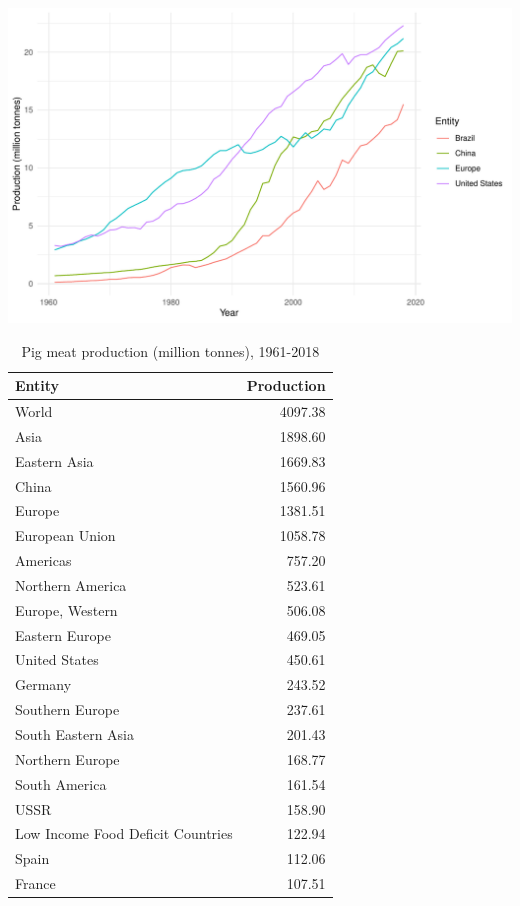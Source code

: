 \documentclass[11pt,a4paper,]{article}
\begin{document}
\includegraphics{report_files/figure-latex/poultry-1.pdf}

\begin{table}

\caption{\label{tab:pig}Pig meat production (million tonnes), 1961-2018}
\centering
\begin{tabular}[t]{lr}
\toprule
Entity & Production\\
\midrule
World & 4097.38\\
Asia & 1898.60\\
Eastern Asia & 1669.83\\
China & 1560.96\\
Europe & 1381.51\\
\addlinespace
European Union & 1058.78\\
Americas & 757.20\\
Northern America & 523.61\\
Europe, Western & 506.08\\
Eastern Europe & 469.05\\
\addlinespace
United States & 450.61\\
Germany & 243.52\\
Southern Europe & 237.61\\
South Eastern Asia & 201.43\\
Northern Europe & 168.77\\
\addlinespace
South America & 161.54\\
USSR & 158.90\\
Low Income Food Deficit Countries & 122.94\\
Spain & 112.06\\
France & 107.51\\
\bottomrule
\end{tabular}
\end{table}
\end{document}
